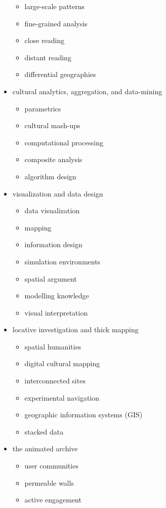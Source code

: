 \begin{itemize}
  \begin{itemize}
    \item large-scale patterns
    \item	fine-grained analysis
    \item	close reading
    \item	distant reading
    \item	differential geographies
  \end{itemize}
  \item cultural analytics, aggregation, and data-mining
  \begin{itemize}
    \item parametrics
    \item	cultural mash-ups
    \item	computational processing
    \item	composite analysis
    \item	algorithm design
  \end{itemize}
  \item visualization and data design
  \begin{itemize}
    \item data visualization
    \item	mapping
    \item	information design
    \item	simulation environments
    \item	spatial argument
    \item	modelling knowledge
    \item	visual interpretation
  \end{itemize}
  \item locative investigation and thick mapping
  \begin{itemize}
    \item spatial humanities
    \item	digital cultural mapping
    \item	interconnected sites
    \item	experimental navigation
    \item	geographic information systems (GIS)
    \item	stacked data
  \end{itemize}
  \item the animated archive
  \begin{itemize}
    \item user communities
    \item	permeable walls
    \item	active engagement

\end{itemize}
\end{itemize}
